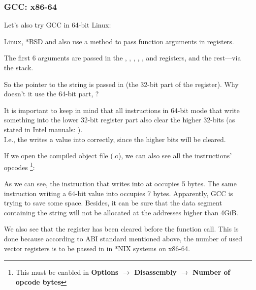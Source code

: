 \subsubsection{GCC: x86-64}

Let's also try GCC in 64-bit Linux:



Linux, *BSD and \MacOSX also use a method to pass function arguments in registers. \SysVABI

The first 6 arguments are passed in the \RDI, \RSI, \RDX, \RCX, , and   registers, and the rest---via the stack.

So the pointer to the string is passed in \EDI (the 32-bit part of the register).
Why doesn't it use the 64-bit part, \RDI?

It is important to keep in mind that all \MOV instructions in 64-bit mode that write something into the lower 32-bit register part also clear the higher 32-bits (as stated in Intel manuals: ).\\
I.e., the  writes a value into \RAX correctly, since the higher bits will be cleared.

If we open the compiled object file (.o), we can also see all the instructions' opcodes
\footnote{This must be enabled in \textbf{Options $\rightarrow$ Disassembly $\rightarrow$ Number of opcode bytes}}:



\label{hw_EDI_instead_of_RDI}
As we can see, the instruction that writes into \EDI at  occupies 5 bytes.
The same instruction writing a 64-bit value into \RDI occupies 7 bytes.
Apparently, GCC is trying to save some space.
Besides, it can be sure that the data segment containing the string will not be allocated at the addresses higher than 4\gls{GiB}.

\label{SysVABI_input_EAX}
We also see that the \EAX register has been cleared before the \printf function call.
This is done because according to \ac{ABI} standard mentioned above,
the number of used vector registers is to be passed in \EAX in *NIX systems on x86-64.

